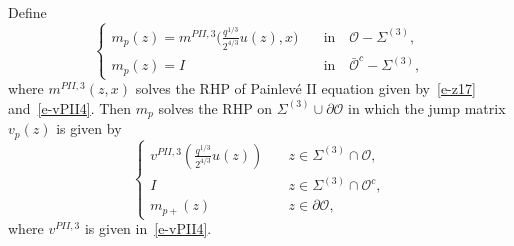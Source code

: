 \documentclass{amsart}
\theoremstyle{definition}
\theoremstyle{remark}
\numberwithin{equation}{section}
\begin{document}
Define 
\begin{equation}
  \begin{cases}
    m_p(z)=m^{PII,3}\bigl(\frac{q^{1/3}}{2^{4/3}}u(z),x\bigr)& 
\quad\text{in} \quad\mathcal{O}-\Sigma^{(3)},\\
    m_p(z)= I& \quad\text{in}\quad\bar{\mathcal{O}}^c-\Sigma^{(3)},
  \end{cases}
\end{equation}
where $m^{PII,3}(z,x)$ solves the RHP of Painlev\'e II equation 
given by~\eqref{e-z17} and~\eqref{e-vPII4}.
Then $m_p$ solves the RHP on $\Sigma^{(3)}\cup\partial\mathcal{O}$ 
in which the jump matrix $v_p(z)$ is given by 
\begin{equation}
  \begin{cases}
    v^{PII,3}(\frac{q^{1/3}}{2^{4/3}}u(z))&\quad 
z\in\Sigma^{(3)}\cap\mathcal{O},\\
    I& \quad z\in\Sigma^{(3)}\cap\mathcal{O}^c,\\
    m_{p+}(z)& \quad z\in\partial\mathcal{O},
  \end{cases}
\end{equation}
where $v^{PII,3}$ is given in~\eqref{e-vPII4}.
\end{document}
